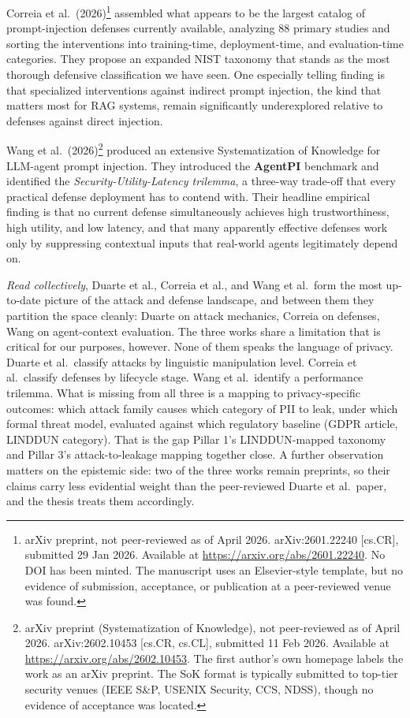 \documentclass[12pt,a4paper]{report}
\begin{document}
Correia et al.\ (2026)\footnote{arXiv preprint, not peer-reviewed as of April 2026. arXiv:2601.22240 [cs.CR], submitted 29 Jan 2026. Available at \url{https://arxiv.org/abs/2601.22240}. No DOI has been minted. The manuscript uses an Elsevier-style template, but no evidence of submission, acceptance, or publication at a peer-reviewed venue was found.} assembled what appears to be the largest catalog of prompt-injection defenses currently available, analyzing 88 primary studies and sorting the interventions into training-time, deployment-time, and evaluation-time categories. They propose an expanded NIST taxonomy that stands as the most thorough defensive classification we have seen. One especially telling finding is that specialized interventions against indirect prompt injection, the kind that matters most for RAG systems, remain significantly underexplored relative to defenses against direct injection.

Wang et al.\ (2026)\footnote{arXiv preprint (Systematization of Knowledge), not peer-reviewed as of April 2026. arXiv:2602.10453 [cs.CR, cs.CL], submitted 11 Feb 2026. Available at \url{https://arxiv.org/abs/2602.10453}. The first author's own homepage labels the work as an arXiv preprint. The SoK format is typically submitted to top-tier security venues (IEEE S\&P, USENIX Security, CCS, NDSS), though no evidence of acceptance was located.} produced an extensive Systematization of Knowledge for LLM-agent prompt injection. They introduced the \textbf{AgentPI} benchmark and identified the \emph{Security-Utility-Latency trilemma}, a three-way trade-off that every practical defense deployment has to contend with. Their headline empirical finding is that no current defense simultaneously achieves high trustworthiness, high utility, and low latency, and that many apparently effective defenses work only by suppressing contextual inputs that real-world agents legitimately depend on.

\begin{critbox}
\textit{Read collectively}, Duarte et al., Correia et al., and Wang et al.\ form the most up-to-date picture of the attack and defense landscape, and between them they partition the space cleanly: Duarte on attack mechanics, Correia on defenses, Wang on agent-context evaluation. The three works share a limitation that is critical for our purposes, however. None of them speaks the language of privacy. Duarte et al.\ classify attacks by linguistic manipulation level. Correia et al.\ classify defenses by lifecycle stage. Wang et al.\ identify a performance trilemma. What is missing from all three is a mapping to privacy-specific outcomes: which attack family causes which category of PII to leak, under which formal threat model, evaluated against which regulatory baseline (GDPR article, LINDDUN category). That is the gap Pillar 1's LINDDUN-mapped taxonomy and Pillar 3's attack-to-leakage mapping together close. A further observation matters on the epistemic side: two of the three works remain preprints, so their claims carry less evidential weight than the peer-reviewed Duarte et al.\ paper, and the thesis treats them accordingly.
\end{critbox}
\end{document}
